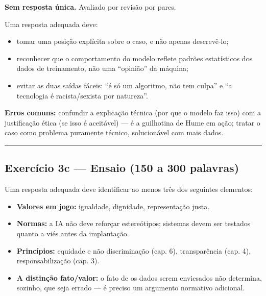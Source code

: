 \documentclass[
  11pt,
]{article}
\providecommand{\tightlist}{%
  \setlength{\itemsep}{0pt}\setlength{\parskip}{0pt}}
\begin{document}
\textbf{Sem resposta única.} Avaliado por revisão por pares.

Uma resposta adequada deve:

\begin{itemize}
\tightlist
\item
  tomar uma posição explícita sobre o caso, e não apenas descrevê-lo;
\item
  reconhecer que o comportamento do modelo reflete padrões estatísticos
  dos dados de treinamento, não uma ``opinião'' da máquina;
\item
  evitar as duas saídas fáceis: ``é só um algoritmo, não tem culpa'' e
  ``a tecnologia é racista/sexista por natureza''.
\end{itemize}

\textbf{Erros comuns:} confundir a explicação técnica (por que o modelo
faz isso) com a justificação ética (se isso é aceitável) --- é a
guilhotina de Hume em ação; tratar o caso como problema puramente
técnico, solucionável com mais dados.

\begin{center}\rule{0.5\linewidth}{0.5pt}\end{center}

\hypertarget{exercuxedcio-3c-ensaio-150-a-300-palavras}{%
\subsection{Exercício 3c --- Ensaio (150 a 300
palavras)}\label{exercuxedcio-3c-ensaio-150-a-300-palavras}}

Uma resposta adequada deve identificar ao menos três dos seguintes
elementos:

\begin{itemize}
\tightlist
\item
  \textbf{Valores em jogo:} igualdade, dignidade, representação justa.
\item
  \textbf{Normas:} a IA não deve reforçar estereótipos; sistemas devem
  ser testados quanto a viés antes da implantação.
\item
  \textbf{Princípios:} equidade e não discriminação (cap. 6),
  transparência (cap. 4), responsabilização (cap. 3).
\item
  \textbf{A distinção fato/valor:} o fato de os dados serem enviesados
  não determina, sozinho, que seja errado --- é preciso um argumento
  normativo adicional.
\end{itemize}
\end{document}
